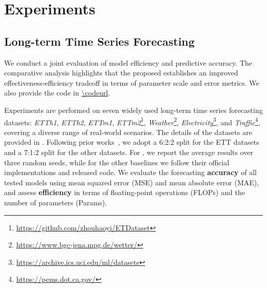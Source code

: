 \section{Experiments}
\label{sec:exp}

\subsection{Long-term Time Series Forecasting}

We conduct a joint evaluation of model efficiency and predictive accuracy. 
The comparative analysis highlights that the proposed \textit{\sysname} establishes an improved effectiveness-efficiency tradeoff in terms of parameter scale and error metrics.
We also provide the code in \url{\codeurl}.

Experiments are performed on seven widely used long-term time series forecasting datasets: 
\textit{ETTh1}, 
\textit{ETTh2}, 
\textit{ETTm1}, 
\textit{ETTm2}\footnote{\url{https://github.com/zhouhaoyi/ETDataset}}, 
\textit{Weather}\footnote{\url{https://www.bgc-jena.mpg.de/wetter/}}, 
\textit{Electricity}\footnote{\url{https://archive.ics.uci.edu/ml/datasets}}, 
and \textit{Traffic}\footnote{\url{https://pems.dot.ca.gov/}}, 
covering a diverse range of real-world scenarios.
The details of the datasets are provided in . 
Following prior works~\citep{nie2023patchtst, zhang2023crossformer, huang2025timebase}, we adopt a 6:2:2 split for the ETT datasets and a 7:1:2 split for the other datasets. 
For \sysname, we report the average results over three random seeds, while for the other baselines we follow their official implementations and released code. 
We evaluate the forecasting \textbf{accuracy} of all tested models using mean squared error (MSE) and mean absolute error (MAE), 
and assess \textbf{efficiency} in terms of floating-point operations (FLOPs) and the number of parameters (Params).

